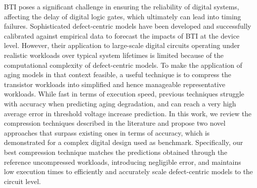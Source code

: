\label{ch:chapter02}
\gls{BTI} poses a significant challenge in ensuring the reliability of digital systems, affecting the delay of digital logic gates, which ultimately can lead into timing failures. Sophisticated defect-centric models have been developed and successfully calibrated against empirical data to forecast the impacts of \gls{BTI} at the device level. However, their application to large-scale digital circuits operating under realistic workloads over typical system lifetimes is limited because of the computational complexity of defect-centric models. To make the application of aging models in that context feasible, a useful technique is to compress the transistor workloads into simplified and hence manageable representative workloads. While fast in terms of execution speed, previous techniques struggle with accuracy when predicting aging degradation, and can reach a very high average error in threshold voltage increase prediction. In this work, we review the compression techniques described in the literature and propose two novel approaches that surpass existing ones in terms of accuracy, which is demonstrated for a complex digital design used as benchmark. Specifically, our best compression technique matches the predictions obtained through the reference uncompressed workloads, introducing negligible error, and maintains low execution times to efficiently and accurately scale defect-centric models to the circuit level.



